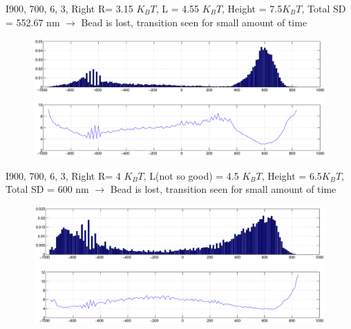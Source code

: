 \documentclass{beamer}
\begin{document}
\begin{frame}{I900, 700, 6, 3, Right} 
R= 3.15 $K_BT$, L = 4.55 $K_BT$, Height = 7.5$K_BT$, Total SD = 552.67 nm $\rightarrow$ Bead is lost, transition seen for small amount of time
\begin{figure}
    \centering
    \includegraphics[height=4.5cm,width=12cm]{I900_right_15.eps}
    \label{fig:graph20}
\end{figure}


\end{frame}

\begin{frame}{I900, 700, 6, 3, Right} 
R= 4 $K_BT$, L(not so good) = 4.5 $K_BT$, Height = 6.5$K_BT$, Total SD = 600 nm $\rightarrow$ Bead is lost, transition seen for small amount of time
\begin{figure}
    \centering
    \includegraphics[height=4.5cm,width=12cm]{I900_right_20.eps}
    \label{fig:graph21}
\end{figure}


\end{frame}
\end{document}
